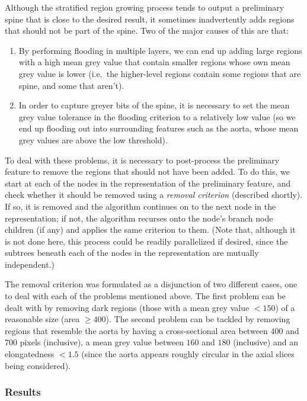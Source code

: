 Although the stratified region growing process tends to output a preliminary spine that is close to the desired result, it sometimes inadvertently adds regions that should not be part of the spine. Two of the major causes of this are that:
%
\begin{enumerate}

\item By performing flooding in multiple layers, we can end up adding large regions with a high mean grey value that contain smaller regions whose own mean grey value is lower (i.e.~the higher-level regions contain some regions that are spine, and some that aren't).

\item In order to capture greyer bits of the spine, it is necessary to set the mean grey value tolerance in the flooding criterion to a relatively low value (so we end up flooding out into surrounding features such as the aorta, whose mean grey values are above the low threshold).

\end{enumerate}
%
To deal with these problems, it is necessary to post-process the preliminary feature to remove the regions that should not have been added. To do this, we start at each of the nodes in the representation of the preliminary feature, and check whether it should be removed using a \emph{removal criterion} (described shortly). If so, it is removed and the algorithm continues on to the next node in the representation; if not, the algorithm recurses onto the node's branch node children (if any) and applies the same criterion to them. (Note that, although it is not done here, this process could be readily parallelized if desired, since the subtrees beneath each of the nodes in the representation are mutually independent.)

The removal criterion was formulated as a disjunction of two different cases, one to deal with each of the problems mentioned above. The first problem can be dealt with by removing dark regions (those with a mean grey value $< 150$) of a reasonable size (area $\ge 400$). The second problem can be tackled by removing regions that resemble the aorta by having a cross-sectional area between $400$ and $700$ pixels (inclusive), a mean grey value between $160$ and $180$ (inclusive) and an elongatedness $< 1.5$ (since the aorta appears roughly circular in the axial slices being considered).

\subsubsection{Results}

